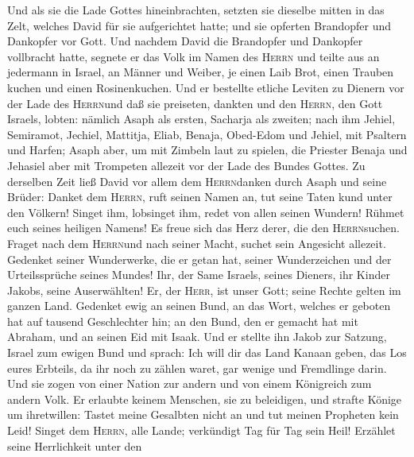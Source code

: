 Und als sie die Lade Gottes hineinbrachten, setzten sie
dieselbe mitten in das Zelt, welches David für sie aufgerichtet hatte;
und sie opferten Brandopfer und Dankopfer vor Gott.  Und
nachdem David die Brandopfer und Dankopfer vollbracht hatte, segnete er
das Volk im Namen des \textsc{Herrn} und teilte aus an
jedermann in Israel, an Männer und Weiber, je einen Laib Brot, einen
Trauben kuchen und einen Rosinenkuchen.  Und er bestellte
etliche Leviten zu Dienern vor der Lade des \textsc{Herrn}und daß sie
preiseten, dankten und den \textsc{Herrn}, den Gott Israels, lobten:
 nämlich Asaph als ersten, Sacharja als zweiten; nach ihm
Jehiel, Semiramot, Jechiel, Mattitja, Eliab, Benaja, Obed-Edom und
Jehiel, mit Psaltern und Harfen; Asaph aber, um mit Zimbeln laut zu
spielen,  die Priester Benaja und Jehasiel aber mit
Trompeten allezeit vor der Lade des Bundes Gottes.  Zu
derselben Zeit ließ David vor allem dem \textsc{Herrn}danken durch Asaph
und seine Brüder:  Danket dem \textsc{Herrn}, ruft seinen
Namen an, tut seine Taten kund unter den Völkern!  Singet
ihm, lobsinget ihm, redet von allen seinen Wundern! 
Rühmet euch seines heiligen Namens! Es freue sich das Herz derer, die
den \textsc{Herrn}suchen.  Fraget nach dem
\textsc{Herrn}und nach seiner Macht, suchet sein Angesicht allezeit.
 Gedenket seiner Wunderwerke, die er getan hat, seiner
Wunderzeichen und der Urteilssprüche seines Mundes!  Ihr,
der Same Israels, seines Dieners, ihr Kinder Jakobs, seine Auserwählten!
 Er, der \textsc{Herr}, ist unser Gott; seine Rechte
gelten im ganzen Land.  Gedenket ewig an seinen Bund, an
das Wort, welches er geboten hat auf tausend Geschlechter hin;
 an den Bund, den er gemacht hat mit Abraham, und an
seinen Eid mit Isaak.  Und er stellte ihn Jakob zur
Satzung, Israel zum ewigen Bund und sprach:  Ich will dir
das Land Kanaan geben, das Los eures Erbteils,  da ihr
noch zu zählen waret, gar wenige und Fremdlinge darin. 
Und sie zogen von einer Nation zur andern und von einem Königreich zum
andern Volk.  Er erlaubte keinem Menschen, sie zu
beleidigen, und strafte Könige um ihretwillen:  Tastet
meine Gesalbten nicht an und tut meinen Propheten kein Leid!
 Singet dem \textsc{Herrn}, alle Lande; verkündigt Tag
für Tag sein Heil!  Erzählet seine Herrlichkeit unter den

